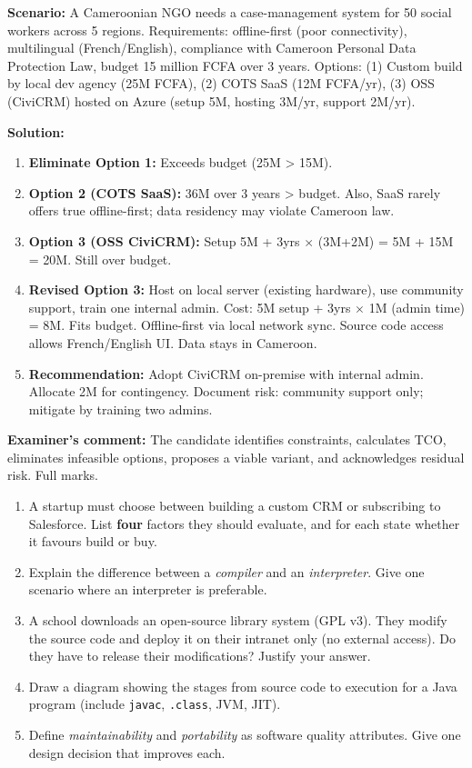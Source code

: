 \documentclass[11pt]{article}
\begin{document}
\begin{exoresolu}
\textbf{Scenario:} A Cameroonian NGO needs a case-management system for 50 social workers across 5 regions. Requirements: offline-first (poor connectivity), multilingual (French/English), compliance with Cameroon Personal Data Protection Law, budget 15 million FCFA over 3 years. Options: (1) Custom build by local dev agency (25M FCFA), (2) COTS SaaS (12M FCFA/yr), (3) OSS (CiviCRM) hosted on Azure (setup 5M, hosting 3M/yr, support 2M/yr).

\textbf{Solution:}
\begin{enumerate}
\item \textbf{Eliminate Option 1:} Exceeds budget (25M > 15M).
\item \textbf{Option 2 (COTS SaaS):} 36M over 3 years > budget. Also, SaaS rarely offers true offline-first; data residency may violate Cameroon law.
\item \textbf{Option 3 (OSS CiviCRM):} Setup 5M + 3yrs $\times$ (3M+2M) = 5M + 15M = 20M. Still over budget.
\item \textbf{Revised Option 3:} Host on local server (existing hardware), use community support, train one internal admin. Cost: 5M setup + 3yrs $\times$ 1M (admin time) = 8M. Fits budget. Offline-first via local network sync. Source code access allows French/English UI. Data stays in Cameroon.
\item \textbf{Recommendation:} Adopt CiviCRM on-premise with internal admin. Allocate 2M for contingency. Document risk: community support only; mitigate by training two admins.
\end{enumerate}
\textbf{Examiner's comment:} The candidate identifies constraints, calculates TCO, eliminates infeasible options, proposes a viable variant, and acknowledges residual risk. Full marks.
\end{exoresolu}

\begin{exercice}
\begin{enumerate}
\item A startup must choose between building a custom CRM or subscribing to Salesforce. List \textbf{four} factors they should evaluate, and for each state whether it favours build or buy.
\item Explain the difference between a \emph{compiler} and an \emph{interpreter}. Give one scenario where an interpreter is preferable.
\item A school downloads an open-source library system (GPL v3). They modify the source code and deploy it on their intranet only (no external access). Do they have to release their modifications? Justify your answer.
\item Draw a diagram showing the stages from source code to execution for a Java program (include \texttt{javac}, \texttt{.class}, JVM, JIT).
\item Define \emph{maintainability} and \emph{portability} as software quality attributes. Give one design decision that improves each.
\end{enumerate}
\end{exercice}
\end{document}
